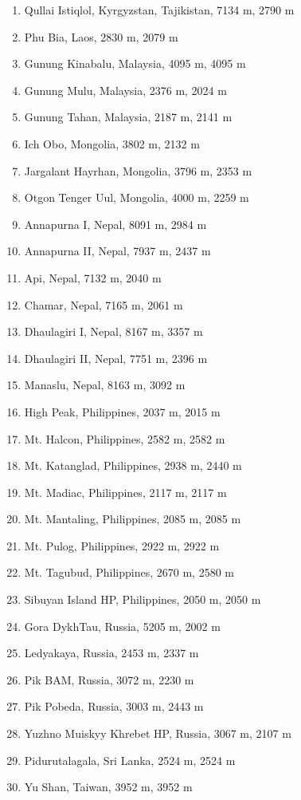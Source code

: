 \documentclass[10pt,twocolumn,letterpaper]{article}
\begin{document}
\begin{flushleft}
\begin{enumerate}
    \item Qullai Istiqlol, Kyrgyzstan, Tajikistan, 7134 m, 2790 m
    \item Phu Bia, Laos, 2830 m, 2079 m
    \item Gunung Kinabalu, Malaysia, 4095 m, 4095 m
    \item Gunung Mulu, Malaysia, 2376 m, 2024 m
    \item Gunung Tahan, Malaysia, 2187 m, 2141 m
    \item Ich Obo, Mongolia, 3802 m, 2132 m
    \item Jargalant Hayrhan, Mongolia, 3796 m, 2353 m
    \item Otgon Tenger Uul, Mongolia, 4000 m, 2259 m
    \item Annapurna I, Nepal, 8091 m, 2984 m
    \item Annapurna II, Nepal, 7937 m, 2437 m
    \item Api, Nepal, 7132 m, 2040 m
    \item Chamar, Nepal, 7165 m, 2061 m
    \item Dhaulagiri I, Nepal, 8167 m, 3357 m
    \item Dhaulagiri II, Nepal, 7751 m, 2396 m
    \item Manaslu, Nepal, 8163 m, 3092 m
    \item High Peak, Philippines, 2037 m, 2015 m
    \item Mt. Halcon, Philippines, 2582 m, 2582 m
    \item Mt. Katanglad, Philippines, 2938 m, 2440 m
    \item Mt. Madiac, Philippines, 2117 m, 2117 m
    \item Mt. Mantaling, Philippines, 2085 m, 2085 m
    \item Mt. Pulog, Philippines, 2922 m, 2922 m
    \item Mt. Tagubud, Philippines, 2670 m, 2580 m
    \item Sibuyan Island HP, Philippines, 2050 m, 2050 m
    \item Gora DykhTau, Russia, 5205 m, 2002 m
    \item Ledyakaya, Russia, 2453 m, 2337 m
    \item Pik BAM, Russia, 3072 m, 2230 m
    \item Pik Pobeda, Russia, 3003 m, 2443 m
    \item Yuzhno Muiskyy Khrebet HP, Russia, 3067 m, 2107 m
    \item Pidurutalagala, Sri Lanka, 2524 m, 2524 m
    \item Yu Shan, Taiwan, 3952 m, 3952 m

\end{enumerate}
\end{flushleft}
\end{document}
